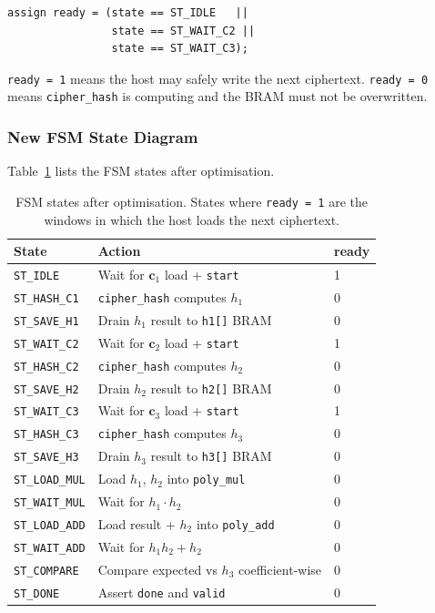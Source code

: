 \documentclass[12pt, a4paper]{article}
\begin{document}
\begin{lstlisting}[caption={Ready signal assignment in \texttt{hash\_verifier.v}.}]
assign ready = (state == ST_IDLE   ||
                state == ST_WAIT_C2 ||
                state == ST_WAIT_C3);
\end{lstlisting}

\texttt{ready = 1} means the host may safely write the next
ciphertext. \texttt{ready = 0} means \texttt{cipher\_hash} is
computing and the BRAM must not be overwritten.

\subsubsection{New FSM State Diagram}

Table~\ref{tab:fsm} lists the FSM states after optimisation.

\begin{table}[h]
\centering
\begin{tabular}{lll}
\toprule
\textbf{State} & \textbf{Action} & \textbf{ready} \\
\midrule
\texttt{ST\_IDLE}     & Wait for $\mathbf{c}_1$ load + \texttt{start} & 1 \\
\texttt{ST\_HASH\_C1} & \texttt{cipher\_hash} computes $h_1$           & 0 \\
\texttt{ST\_SAVE\_H1} & Drain $h_1$ result to \texttt{h1[]} BRAM       & 0 \\
\texttt{ST\_WAIT\_C2} & Wait for $\mathbf{c}_2$ load + \texttt{start}  & 1 \\
\texttt{ST\_HASH\_C2} & \texttt{cipher\_hash} computes $h_2$           & 0 \\
\texttt{ST\_SAVE\_H2} & Drain $h_2$ result to \texttt{h2[]} BRAM       & 0 \\
\texttt{ST\_WAIT\_C3} & Wait for $\mathbf{c}_3$ load + \texttt{start}  & 1 \\
\texttt{ST\_HASH\_C3} & \texttt{cipher\_hash} computes $h_3$           & 0 \\
\texttt{ST\_SAVE\_H3} & Drain $h_3$ result to \texttt{h3[]} BRAM       & 0 \\
\texttt{ST\_LOAD\_MUL}& Load $h_1$, $h_2$ into \texttt{poly\_mul}      & 0 \\
\texttt{ST\_WAIT\_MUL}& Wait for $h_1 \cdot h_2$                       & 0 \\
\texttt{ST\_LOAD\_ADD}& Load result + $h_2$ into \texttt{poly\_add}    & 0 \\
\texttt{ST\_WAIT\_ADD}& Wait for $h_1 h_2 + h_2$                       & 0 \\
\texttt{ST\_COMPARE}  & Compare expected vs $h_3$ coefficient-wise      & 0 \\
\texttt{ST\_DONE}     & Assert \texttt{done} and \texttt{valid}         & 0 \\
\bottomrule
\end{tabular}
\caption{FSM states after optimisation. States where \texttt{ready = 1}
are the windows in which the host loads the next ciphertext.}
\label{tab:fsm}
\end{table}
\end{document}
